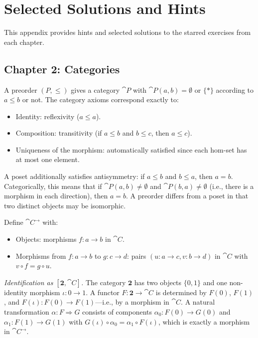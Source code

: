 \chapter{Selected Solutions and Hints}
\label{app:exercises}

This appendix provides hints and selected solutions to the starred exercises from each chapter.

\section*{Chapter 2: Categories}

\begin{exercise}
A preorder $(P, \leq)$ gives a category $\cat{P}$ with $\cat{P}(a,b) = \emptyset$ or $\{*\}$ according to $a \leq b$ or not. The category axioms correspond exactly to:
\begin{itemize}
  \item Identity: reflexivity ($a \leq a$).
  \item Composition: transitivity (if $a \leq b$ and $b \leq c$, then $a \leq c$).
  \item Uniqueness of the morphism: automatically satisfied since each hom-set has at most one element.
\end{itemize}
A poset additionally satisfies antisymmetry: if $a \leq b$ and $b \leq a$, then $a = b$. Categorically, this means that if $\cat{P}(a,b) \neq \emptyset$ and $\cat{P}(b,a) \neq \emptyset$ (i.e., there is a morphism in each direction), then $a = b$. A preorder differs from a poset in that two distinct objects may be isomorphic.
\end{exercise}

\begin{exercise}
Define $\cat{C}^{\to}$ with:
\begin{itemize}
  \item Objects: morphisms $f: a \to b$ in $\cat{C}$.
  \item Morphisms from $f: a \to b$ to $g: c \to d$: pairs $(u: a \to c, v: b \to d)$ in $\cat{C}$ with $v \circ f = g \circ u$.
\end{itemize}

\noindent\textit{Identification as $[\mathbf{2}, \cat{C}]$.} The category $\mathbf{2}$ has two objects $\{0,1\}$ and one non-identity morphism $\iota: 0 \to 1$. A functor $F: \mathbf{2} \to \cat{C}$ is determined by $F(0)$, $F(1)$, and $F(\iota): F(0) \to F(1)$—i.e., by a morphism in $\cat{C}$. A natural transformation $\alpha: F \Rightarrow G$ consists of components $\alpha_0: F(0) \to G(0)$ and $\alpha_1: F(1) \to G(1)$ with $G(\iota) \circ \alpha_0 = \alpha_1 \circ F(\iota)$, which is exactly a morphism in $\cat{C}^{\to}$.
\end{exercise}

